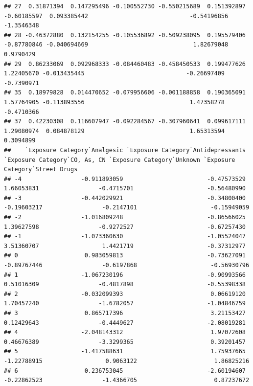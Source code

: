 \documentclass[
]{article}
\begin{document}
\begin{verbatim}
## 27  0.31871394  0.147295496 -0.100552730 -0.550215689  0.151392897                    -0.60185597  0.093385442                             -0.54196856     -1.3546348
## 28 -0.46372880  0.132154255 -0.105536892 -0.509238095  0.195579406                    -0.87780846 -0.040694669                              1.82679048      0.9790429
## 29  0.86233069  0.092968333 -0.084460483 -0.458450533  0.199477626                     1.22405670 -0.013435445                             -0.26697409     -0.7390971
## 35  0.18979828  0.014470652 -0.079956606 -0.001188858  0.190365091                     1.57764905 -0.113893556                              1.47358278     -0.4710366
## 37  0.42230308  0.116607947 -0.092284567 -0.307960641  0.099617111                     1.29080974  0.084878129                              1.65313594      0.3094899
##    `Exposure Category`Analgesic `Exposure Category`Antidepressants `Exposure Category`CO, As, CN `Exposure Category`Unknown `Exposure Category`Street Drugs
## -4                 -0.911893059                        -0.47573529                    1.66053831                 -0.4715701                     -0.56480990
## -3                 -0.442029921                        -0.34800400                   -0.19603217                 -0.2147101                     -0.15949059
## -2                 -1.016809248                        -0.86566025                    1.39627598                 -0.9272527                     -0.67257430
## -1                 -1.073360630                        -1.05524047                    3.51360707                  1.4421719                     -0.37312977
## 0                   0.983059813                        -0.73627091                   -0.89767446                 -0.6197868                     -0.56930796
## 1                  -1.067230196                        -0.90993566                    0.51016309                 -0.4817898                     -0.55398338
## 2                  -0.032099393                         0.06619120                    1.70457240                 -1.6782057                     -1.04846759
## 3                   0.865717396                         3.21153427                    0.12429643                 -0.4449627                     -2.08019281
## 4                  -2.048143312                         1.97072608                    0.46676389                 -3.3299365                      0.39201457
## 5                  -1.417588631                         1.75937665                   -1.22788915                  0.9063122                      1.86825216
## 6                   0.236753045                        -2.60194607                   -0.22862523                 -1.4366705                      0.87237672

\end{verbatim}
\end{document}
